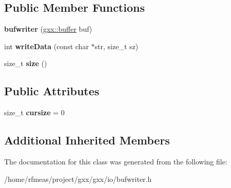 \subsection*{Public Member Functions}
\begin{DoxyCompactItemize}
\item 
{\bfseries bufwriter} (\hyperlink{classgxx_1_1buffer}{gxx\+::buffer} buf)\hypertarget{classgxx_1_1io_1_1bufwriter_a5b300f0fd662417ebbbac62e948437ce}{}\label{classgxx_1_1io_1_1bufwriter_a5b300f0fd662417ebbbac62e948437ce}

\item 
int {\bfseries write\+Data} (const char $\ast$str, size\+\_\+t sz)\hypertarget{classgxx_1_1io_1_1bufwriter_aad34a02b76fbc5f6abfad4f59bc76262}{}\label{classgxx_1_1io_1_1bufwriter_aad34a02b76fbc5f6abfad4f59bc76262}

\item 
size\+\_\+t {\bfseries size} ()\hypertarget{classgxx_1_1io_1_1bufwriter_aee941af370762885650fb7a07fe5ab20}{}\label{classgxx_1_1io_1_1bufwriter_aee941af370762885650fb7a07fe5ab20}

\end{DoxyCompactItemize}
\subsection*{Public Attributes}
\begin{DoxyCompactItemize}
\item 
size\+\_\+t {\bfseries cursize} = 0\hypertarget{classgxx_1_1io_1_1bufwriter_af587a495c8a8cf990589469d93fbd0bb}{}\label{classgxx_1_1io_1_1bufwriter_af587a495c8a8cf990589469d93fbd0bb}

\end{DoxyCompactItemize}
\subsection*{Additional Inherited Members}


The documentation for this class was generated from the following file\+:\begin{DoxyCompactItemize}
\item 
/home/rfmeas/project/gxx/gxx/io/bufwriter.\+h\end{DoxyCompactItemize}
